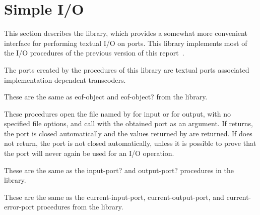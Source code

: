 \section{Simple I/O}
\label{simpleiosection}

This section describes the  library, which
provides a somewhat more convenient interface for performing textual
I/O on ports.  This library implements most of the 
I/O procedures of the previous version of this report~\cite{R5RS}.

The ports created by the procedures of this library are textual ports
associated implementation-dependent transcoders.

\begin{entry}{%
}

These are the same as {\cf eof-object} and {\cf eof-object?} from the
 library.
\end{entry}

\begin{entry}{%
}

These procedures open the file named by  for input or
for output, with no specified file options, and call  with
the obtained port as an argument.  If  returns, the
port is closed automatically and the values returned by  are
returned. If  does not return, the port is not
closed automatically, unless it is possible to prove that the port
will never again be used for an I/O operation.
\end{entry}

\begin{entry}{%
}

These are the same as the {\cf input-port?} and {\cf output-port?}
procedures in the  library.
\end{entry}

\begin{entry}{%
}
 
These are the same as the {\cf current-input-port}, {\cf
  current-output-port}, and {\cf current-error-port} procedures from
the  library.
\end{entry}

